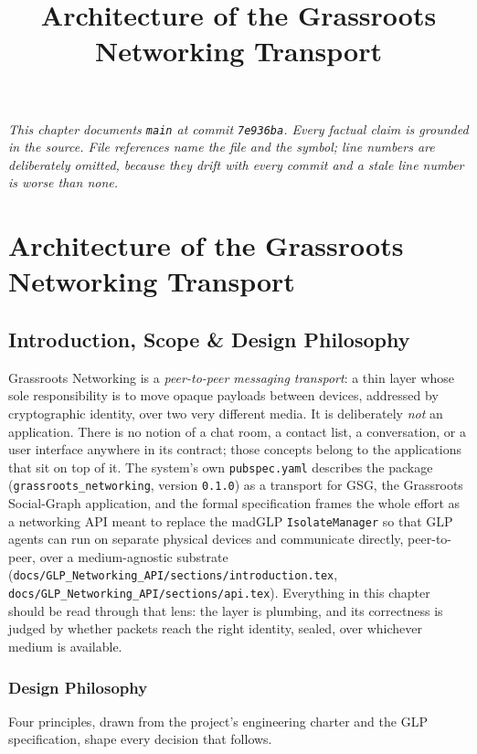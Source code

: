 \documentclass[11pt]{report}
\title{\textbf{Architecture of the Grassroots Networking Transport}}
\author{}
\date{}
\newcommand{\code}[1]{\texttt{\small #1}}
\begin{document}
\maketitle
{\small\noindent\emph{This chapter documents \texttt{main} at commit \texttt{7e936ba}. Every factual claim is grounded in the source. File references name the file and the symbol; line numbers are deliberately omitted, because they drift with every commit and a stale line number is worse than none.}}
\tableofcontents
\chapter{Architecture of the Grassroots Networking Transport}


\section{Introduction, Scope \& Design Philosophy}

Grassroots Networking is a \emph{peer-to-peer messaging transport}: a thin layer whose sole responsibility is to move opaque payloads between devices, addressed by cryptographic identity, over two very different media. It is deliberately \emph{not} an application. There is no notion of a chat room, a contact list, a conversation, or a user interface anywhere in its contract; those concepts belong to the applications that sit on top of it. The system's own \code{pubspec.yaml} describes the package (\code{grassroots_networking}, version \code{0.1.0}) as a transport for GSG, the Grassroots Social-Graph application, and the formal specification frames the whole effort as a networking API meant to replace the madGLP \code{IsolateManager} so that GLP agents can run on separate physical devices and communicate directly, peer-to-peer, over a medium-agnostic substrate (\code{docs/GLP_Networking_API/sections/introduction.tex}, \code{docs/GLP_Networking_API/sections/api.tex}). Everything in this chapter should be read through that lens: the layer is plumbing, and its correctness is judged by whether packets reach the right identity, sealed, over whichever medium is available.

\subsection{Design Philosophy}

Four principles, drawn from the project's engineering charter and the GLP specification, shape every decision that follows.
\end{document}
